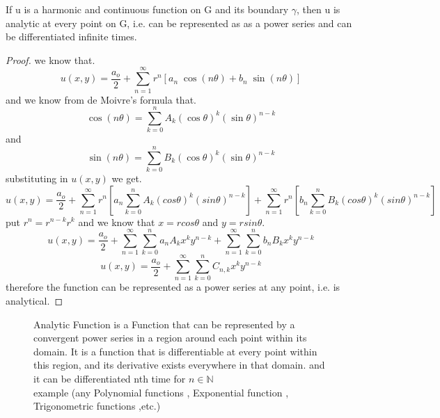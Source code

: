 \documentclass[]{article}
\begin{document}
\begin{theorem}
    If u is a harmonic and continuous function on G and its boundary $\gamma$, then u is analytic at every point on G, i.e. can be represented as as a power series and can be differentiated infinite times.    
\end{theorem}
\begin{proof}
    we know that.       
    \[
        u(x,y) = \frac{a_o}{2} + \sum_{n=1}^{\infty} r^n[a_n\;\cos(n\theta)+b_n\;\sin(n\theta)]    
    \]
    and we know from de Moivre's formula that.
    \[
        \cos(n\theta) = \sum_{k=0}^{n} A_k {(\cos\theta)}^k {(\sin\theta)}^{n-k}    
    \]
    and
    \[
        \sin(n\theta) =  \sum_{k=0}^{n} B_k {(\cos\theta)}^k {(\sin\theta)}^{n-k}    
    \]
    substituting in $u(x,y)$ we get.
    \[
        u(x,y) = \frac{a_o}{2} + \sum_{n=1}^{\infty} r^n\left[a_n\sum_{k=0}^{n} A_k (cos\theta)^k (sin\theta)^{n-k}\right] + \sum_{n=1}^{\infty} r^n\left[b_n\sum_{k=0}^{n} B_k (cos\theta)^k (sin\theta)^{n-k}\right]    
    \]
    put $r^n = r^{n-k}r^k $ and we know that $x = rcos\theta$ and $y=rsin\theta$.
    \[
        u(x,y) = \frac{a_o}{2} + \sum_{n=1}^{\infty}\sum_{k=0}^{n} a_n A_k x^k y^{n-k} + \sum_{n=1}^{\infty}\sum_{k=0}^{n}b_n B_k x^k y^{n-k}    
    \]
    \[
        u(x,y) = \frac{a_o}{2} + \sum_{n=1}^{\infty}\sum_{k=0}^{n} C_{n,k} x^k y^{n-k}
    \]
    therefore the function can be represented as a power series at any point, i.e. is analytical.
\end{proof}
\begin{figure}[b]
\begin{enrichment*}{Analytic Function}
    is a Function that can be represented by a convergent power series in a region around each point within its domain. It is a function that is differentiable at every point within this region, and its derivative exists everywhere in that domain. 
    and it can be differentiated nth time for $n \in \mathbb{N}$
    \\
    example (any Polynomial functions , Exponential function , Trigonometric functions ,etc.)
\end{enrichment*}    
\end{figure}


\newpage

\setcounter{equation}{0}
\end{document}
